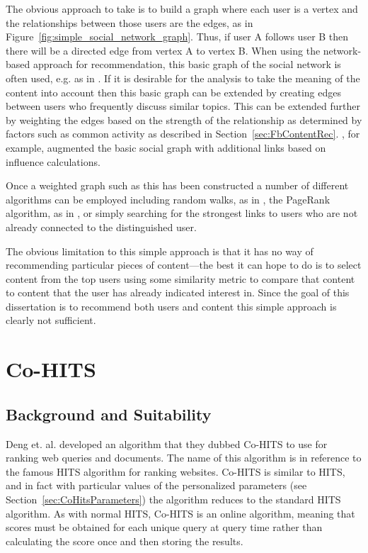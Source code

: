 The obvious approach to take is to build a graph where each user is a vertex and the relationships between those users are the edges, as in Figure~\ref{fig:simple_social_network_graph}. Thus, if user A follows user B then there will be a directed edge from vertex A to vertex B. When using the network-based approach for recommendation, this basic graph of the social network is often used, e.g. as in \cite{Hangal2010}. If it is desirable for the analysis to take the meaning of the content into account then this basic graph can be extended by creating edges between users who frequently discuss similar topics. This can be extended further by weighting the edges based on the strength of the relationship as determined by factors such as common activity as described in Section~\ref{sec:FbContentRec}. \cite{Hangal2010}, for example, augmented the basic social graph with additional links based on influence calculations.

Once a weighted graph such as this has been constructed a number of different algorithms can be employed including random walks, as in \cite{Backstrom2010}, the PageRank algorithm, as in \cite{Weng2010}, or simply searching for the strongest links to users who are not already connected to the distinguished user.

The obvious limitation to this simple approach is that it has no way of recommending particular pieces of content---the best it can hope to do is to select content from the top users using some similarity metric to compare that content to content that the user has already indicated interest in. Since the goal of this dissertation is to recommend both users and content this simple approach is clearly not sufficient.

\section{Co-HITS}

\subsection{Background and Suitability}
\label{sec:CoHitsBackground}

Deng et. al. \cite{Deng2009} developed an algorithm that they dubbed Co-HITS to use for ranking web queries and documents. The name of this algorithm is in reference to the famous HITS algorithm \cite{Kleinberg1999} for ranking websites. Co-HITS is similar to HITS, and in fact with particular values of the personalized parameters (see Section~\ref{sec:CoHitsParameters}) the algorithm reduces to the standard HITS algorithm. As with normal HITS, Co-HITS is an online algorithm, meaning that scores must be obtained for each unique query at query time rather than calculating the score once and then storing the results.

